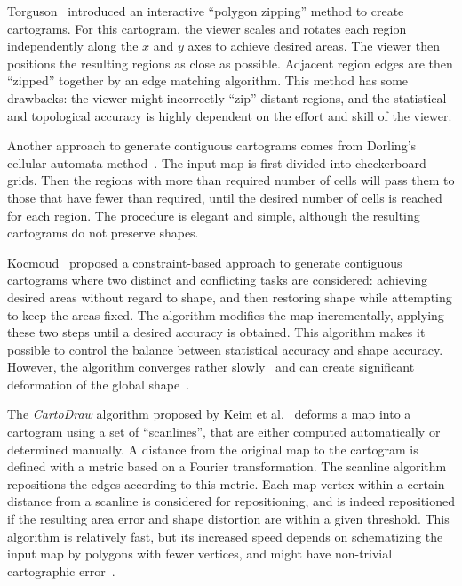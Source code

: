 \documentclass{egpubl}
\begin{document}
Torguson~\cite{torguson1990cartogram} introduced an interactive ``polygon zipping'' method to create cartograms. For this cartogram, the viewer scales and rotates each region independently along the $x$ and $y$ axes to achieve desired areas. The viewer then positions the resulting regions as close as possible. Adjacent region edges are then ``zipped'' together by an edge matching algorithm.
 This method has some drawbacks: the viewer might incorrectly ``zip'' distant regions, and the statistical and topological accuracy is highly dependent on the effort and skill of the viewer.


 Another approach to generate contiguous cartograms comes from Dorling's cellular automata method~\cite{dorling96}. The input map is first divided into checkerboard grids. Then the regions with more than required number of cells will pass them to those that have fewer than required, until the desired number of cells is reached for each region. The procedure is elegant and simple, although the resulting cartograms do not preserve shapes.

Kocmoud~\cite{kocmoud1997constructing} proposed a constraint-based approach to generate contiguous cartograms where two distinct and conflicting tasks are considered: achieving desired areas without regard to shape, and then restoring shape while attempting to keep the areas fixed. The algorithm modifies the map incrementally, applying these two steps until a desired accuracy is obtained. This algorithm makes it possible to control the balance between statistical accuracy and shape accuracy. However, the algorithm
converges rather slowly~\cite{GN04} and can create significant deformation of the global shape~\cite{KNP04}. 


The \textit{CartoDraw} algorithm proposed by Keim et al.~\cite{KNP04} deforms a map into a cartogram using a set of ``scanlines'', that are either computed automatically or determined manually.
A distance from the original map to the cartogram is defined with a metric based on a Fourier transformation. The scanline algorithm repositions the edges according to this metric. Each map vertex within a certain distance from a scanline is considered for repositioning, and is indeed repositioned if the resulting area error and shape distortion are within a given threshold. This algorithm is relatively fast, but its increased speed depends on schematizing the input map by polygons with fewer vertices, and might have non-trivial cartographic error~\cite{GN04}. 
\end{document}
